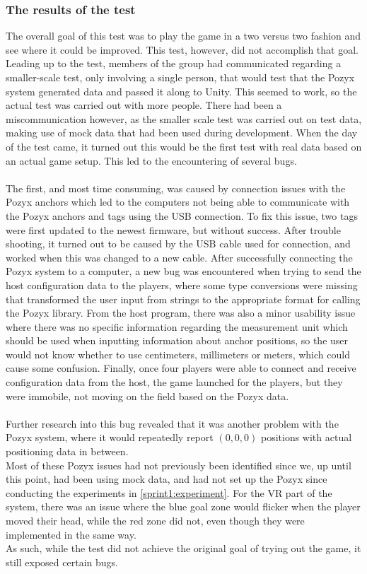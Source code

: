 \subsubsection{The results of the test}
The overall goal of this test was to play the game in a two versus two fashion and see where it could be improved.
This test, however, did not accomplish that goal.
Leading up to the test, members of the group had communicated regarding a smaller-scale test, only involving a single person, that would test that the Pozyx system generated data and passed it along to Unity.
This seemed to work, so the actual test was carried out with more people.
There had been a miscommunication however, as the smaller scale test was carried out on test data, making use of mock data that had been used during development.
When the day of the test came, it turned out this would be the first test with real data based on an actual game setup.
This led to the encountering of several bugs.
\\\\
The first, and most time consuming, was caused by connection issues with the Pozyx anchors which led to the computers not being able to communicate with the Pozyx anchors and tags using the USB connection.
To fix this issue, two tags were first updated to the newest firmware, but without success.
After trouble shooting, it turned out to be caused by the USB cable used for connection, and worked when this was changed to a new cable.
After successfully connecting the Pozyx system to a computer, a new bug was encountered when trying to send the host configuration data to the players, where some type conversions were missing that transformed the user input from strings to the appropriate format for calling the Pozyx library.
From the host program, there was also a minor usability issue where there was no specific information regarding the measurement unit which should be used when inputting information about anchor positions, so the user would not know whether to use centimeters, millimeters or meters, which could cause some confusion.
Finally, once four players were able to connect and receive configuration data from the host, the game launched for the players, but they were immobile, not moving on the field based on the Pozyx data.
\\\\
Further research into this bug revealed that it was another problem with the Pozyx system, where it would repeatedly report $(0,0,0)$ positions with actual positioning data in between.\\
Most of these Pozyx issues had not previously been identified since we, up until this point, had been using mock data, and had not set up the Pozyx since conducting the experiments in \autoref{sprint1:experiment}.
For the VR part of the system, there was an issue where the blue goal zone would flicker when the player moved their head, while the red zone did not, even though they were implemented in the same way.\\
As such, while the test did not achieve the original goal of trying out the game, it still exposed certain bugs.
